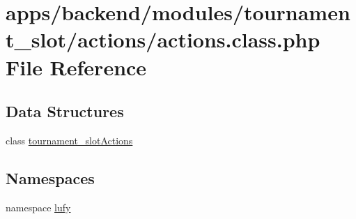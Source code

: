 \hypertarget{backend_2modules_2tournament__slot_2actions_2actions_8class_8php}{\section{apps/backend/modules/tournament\-\_\-slot/actions/actions.class.\-php File Reference}
\label{backend_2modules_2tournament__slot_2actions_2actions_8class_8php}
}
\subsection*{Data Structures}
\begin{DoxyCompactItemize}
\item 
class \hyperlink{classtournament__slot_actions}{tournament\-\_\-slot\-Actions}
\end{DoxyCompactItemize}
\subsection*{Namespaces}
\begin{DoxyCompactItemize}
\item 
namespace \hyperlink{namespacelufy}{lufy}
\end{DoxyCompactItemize}
